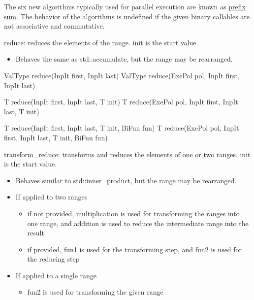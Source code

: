 
The six new algorithms typically used for parallel execution are known as \href{https://en.wikipedia.org/wiki/Prefix_sum}{prefix sum}. The behavior of the algorithms is undefined if the given binary callables are not associative and commutative.

reduce: reduces the elements of the range. init is the start value.

\begin{itemize}
\item
Behaves the same as std::accumulate, but the range may be rearranged.
\end{itemize}

\begin{cpp}
ValType reduce(InpIt first, InpIt last)
ValType reduce(ExePol pol, InpIt first, InpIt last)

T reduce(InpIt first, InpIt last, T init)
T reduce(ExePol pol, InpIt first, InpIt last, T init)

T reduce(InpIt first, InpIt last, T init, BiFun fun)
T reduce(ExePol pol, InpIt first, InpIt last, T init, BiFun fun)
\end{cpp}

transform\_reduce: transforms and reduces the elements of one or two ranges. init is the start value.

\begin{itemize}
\item
Behaves similar to std::inner\_product, but the range may be rearranged.

\item
If applied to two ranges
\begin{itemize}
\item
if not provided, multiplication is used for transforming the ranges into one range, and addition is used to reduce the intermediate range into the result

\item
if provided, fun1 is used for the transforming step, and fun2 is used for the reducing step
\end{itemize}

\item
If applied to a single range
\begin{itemize}
\item
fun2 is used for transforming the given range
\end{itemize}
\end{itemize}

